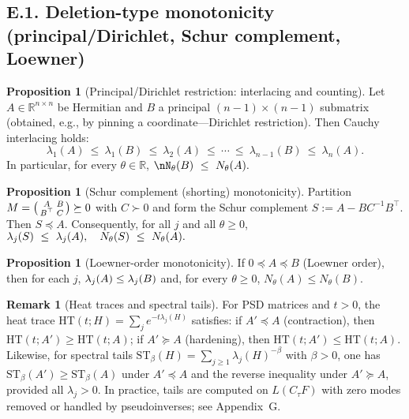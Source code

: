 \documentclass[11pt]{article}
\numberwithin{equation}{section}
\theoremstyle{plain}
\theoremstyle{definition}
\theoremstyle{remark}
\newcommand{\RR}{\mathbb{R}}
\theoremstyle{plain}
\theoremstyle{definition}
\numberwithin{equation}{section}
\newtheorem{proposition}[theorem]{Proposition}
\theoremstyle{definition}
\newtheorem{remark}[theorem]{Remark}
\numberwithin{equation}{section}
\theoremstyle{plain}
\theoremstyle{definition}
\theoremstyle{remark}
\providecommand{\n}{\unskip\space}
\begin{document}
\subsection*{E.1. Deletion-type monotonicity (principal/Dirichlet, Schur complement, Loewner)}

\begin{proposition}[Principal/Dirichlet restriction: interlacing and counting]\label{E:prop:dirichlet}
Let \(A\in\RR^{n\times n}\) be Hermitian and \(B\) a principal \((n-1)\times(n-1)\) submatrix (obtained, e.g., by pinning a coordinate—Dirichlet restriction).
Then Cauchy interlacing holds:
\[
\lambda_1(A)\ \le\ \lambda_1(B)\ \le\ \lambda_2(A)\ \le\ \cdots\ \le\ \lambda_{n-1}(B)\ \le\ \lambda_n(A).
\]
In particular, for every \(\theta\in\RR\),
\(\nN_\theta(B)\ \le\ N_\theta(A).\n\)
\end{proposition}

\begin{proposition}[Schur complement (shorting) monotonicity]\label{E:prop:schur}
Partition \(M=\begin{psmallmatrix}A & B\\ B^\top & C\end{psmallmatrix}\succeq 0\) with \(C\succ 0\) and form the Schur complement \(S:=A-BC^{-1}B^\top\).
Then \(S\preceq A\).
Consequently, for all \(j\) and all \(\theta\ge 0\),
\(\n\lambda_j(S)\ \le\ \lambda_j(A),\quad N_\theta(S)\ \le\ N_\theta(A).\n\)
\end{proposition}

\begin{proposition}[Loewner-order monotonicity]\label{E:prop:loewner}
If \(0\preceq A\preceq B\) (Loewner order), then for each \(j\),
\(\n\lambda_j(A)\le \lambda_j(B)\n\)
and, for every \(\theta\ge 0\), \(N_\theta(A)\le N_\theta(B)\).
\end{proposition}

\begin{remark}[Heat traces and spectral tails]
For PSD matrices and \(t>0\), the heat trace \(\mathrm{HT}(t;H)=\sum_j e^{-t\lambda_j(H)}\) satisfies:
if \(A'\preceq A\) (contraction), then \(\mathrm{HT}(t;A')\ge \mathrm{HT}(t;A)\); if \(A'\succeq A\) (hardening), then \(\mathrm{HT}(t;A')\le \mathrm{HT}(t;A)\).
Likewise, for spectral tails \(\mathrm{ST}_\beta(H)=\sum_{j\ge 1}\lambda_j(H)^{-\beta}\) with \(\beta>0\), one has \(\mathrm{ST}_\beta(A')\ge \mathrm{ST}_\beta(A)\) under \(A'\preceq A\) and the reverse inequality under \(A'\succeq A\), provided all \(\lambda_j>0\).
In practice, tails are computed on \(L(C_\tau F)\) with zero modes removed or handled by pseudoinverses; see Appendix~G.
\end{remark}
\end{document}
